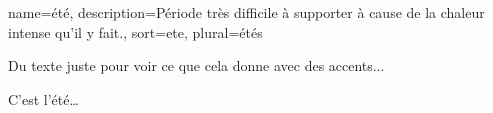\documentclass[frenchb,pdftex]{scrartcl}
\begin{document}

{%
	name={été},
	description={Période très difficile à supporter à cause de la chaleur intense qu'il y fait.},
	sort={ete},
	plural={étés}
}

Du texte juste pour voir ce que cela donne avec des accents...


C'est l'été\dots
\end{document}
